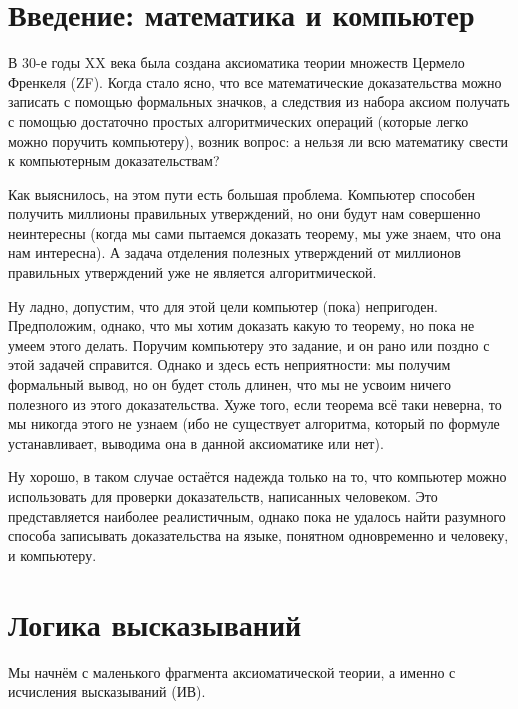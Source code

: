 \documentclass[a4paper,draft]{article}
\begin{document}
\pagebreak


\section*{Введение: математика и компьютер}


\medskip

В 30-е годы XX века была создана аксиоматика теории множеств Цермело Френкеля (ZF).
Когда стало ясно, что все математические доказательства можно записать
с помощью формальных значков, а следствия из набора аксиом получать с помощью достаточно
простых алгоритмических операций (которые легко можно поручить компьютеру),
возник вопрос: а нельзя ли всю математику свести к компьютерным доказательствам?

Как выяснилось, на этом пути есть большая проблема. Компьютер способен получить миллионы правильных
утверждений, но они будут нам совершенно неинтересны (когда мы сами пытаемся доказать теорему,
мы уже знаем, что она нам интересна). А задача отделения полезных утверждений
от миллионов правильных утверждений уже не является алгоритмической.

Ну ладно, допустим, что для этой цели компьютер (пока) непригоден. Предположим, однако,
что мы хотим доказать какую то теорему, но пока не умеем этого делать. Поручим компьютеру
это задание, и он рано или поздно с этой задачей справится.
Однако и здесь есть неприятности: мы получим формальный вывод, но он будет столь длинен,
что мы не усвоим ничего полезного из этого доказательства. Хуже того, если теорема всё таки неверна,
то мы никогда этого не узнаем (ибо не существует алгоритма, который по формуле устанавливает,
выводима она в данной аксиоматике или нет).

Ну хорошо, в таком случае остаётся надежда только на то, что компьютер можно использовать
для проверки доказательств, написанных человеком. Это представляется наиболее реалистичным,
однако пока не удалось найти разумного способа записывать доказательства на языке, понятном одновременно
и человеку, и компьютеру.

\section{Логика высказываний}

Мы начнём с маленького фрагмента аксиоматической теории, а именно с исчисления высказываний (ИВ).
\end{document}
